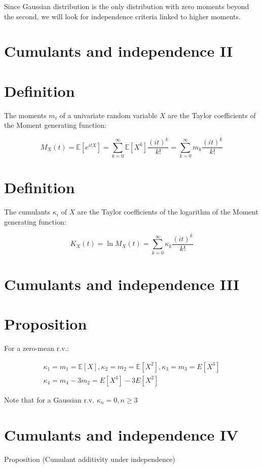 \documentclass[11pt]{article}
\theoremstyle{plain} %
\theoremstyle{remark}
\begin{document}
Since Gaussian distribution is the only distribution with zero moments beyond
the second, we will look for independence criteria linked to higher moments.

\section*{Cumulants and independence II}
\section*{Definition}
The moments $m_{i}$ of a univariate random variable $X$ are the Taylor
coefficients of the Moment generating function:

$$
M_{X}(t)=\mathbb{E}\left[e^{i t X}\right]=\sum_{k=0}^{\infty} \mathbb{E}\left[X^{k}\right] \frac{(i t)^{k}}{k !}=\sum_{k=0}^{\infty} m_{k} \frac{(i t)^{k}}{k !}
$$

\section*{Definition}
The cumulants $\kappa_{i}$ of $X$ are the Taylor coefficients of the logarithm
of the Moment generating function:

$$
K_{X}(t)=\ln M_{X}(t)=\sum_{k=0}^{\infty} \kappa_{k} \frac{(i t)^{k}}{k !}
$$

\section*{Cumulants and independence III}
\section*{Proposition}
For a zero-mean r.v.:

$$
\begin{gathered}
\kappa_{1}=m_{1}=\mathbb{E}[X], \kappa_{2}=m_{2}=\mathbb{E}\left[X^{2}\right], \kappa_{3}=m_{3}=E\left[X^{3}\right] \\
\kappa_{4}=m_{4}-3 m_{2}=E\left[X^{4}\right]-3 E\left[X^{2}\right]
\end{gathered}
$$

Note that for a Gaussian r.v. $\kappa_{n}=0, n \geq 3$

\section*{Cumulants and independence IV}
Proposition (Cumulant additivity under independence)
\end{document}
